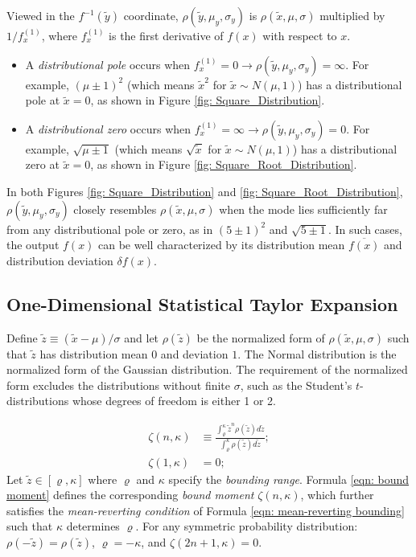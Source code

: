 \documentclass[twoside]{article}
\numberwithin{equation}{section}
\begin{document}
Viewed in the $f^{-1}(\tilde{y})$ coordinate, $\rho(\tilde{y}, \mu_y, \sigma_y)$ is $\rho(\tilde{x}, \mu, \sigma)$ multiplied by $1/f^{(1)}_x$, where $f^{(1)}_x$ is the first derivative of $f(x)$ with respect to $x$.
\begin{itemize}
\item 
A \emph{distributional pole} occurs when $f^{(1)}_x=0 \rightarrow \rho(\tilde{y}, \mu_y, \sigma_y) = \infty$.
For example, $(\mu \pm 1)^2$ (which means $\tilde{x}^2$ for $\tilde{x} \sim N(\mu, 1)$) has a distributional pole at $\tilde{x} = 0$, as shown in Figure \ref{fig: Square_Distribution}.

\item 
A \emph{distributional zero} occurs when $f^{(1)}_x=\infty \rightarrow \rho(\tilde{y}, \mu_y, \sigma_y) = 0$.
For example, $\sqrt{\mu \pm 1}$ (which means $\sqrt{\tilde{x}}$ for $\tilde{x} \sim N(\mu, 1)$) has a distributional zero at $\tilde{x} = 0$, as shown in Figure \ref{fig: Square_Root_Distribution}.

\end{itemize}

In both Figures \ref{fig: Square_Distribution} and \ref{fig: Square_Root_Distribution}, $\rho(\tilde{y}, \mu_y, \sigma_y)$ closely resembles $\rho(\tilde{x}, \mu, \sigma)$ when the mode lies sufficiently far from any distributional pole or zero, as in $(5 \pm 1)^2$ and $\sqrt{5 \pm 1}$.
In such cases, the output $f(x)$ can be well characterized by its distribution mean $\overline{f(x)}$ and distribution deviation $\delta f(x)$. 


\subsection{One-Dimensional Statistical Taylor Expansion}

Define $\tilde{z} \equiv (\tilde{x} - \mu)/\sigma$ and let $\rho(\tilde{z})$ be the normalized form of $\rho(\tilde{x}, \mu, \sigma)$ such that $\tilde{z}$ has distribution mean $0$ and deviation $1$.
The Normal distribution is the normalized form of the Gaussian distribution.
The requirement of the normalized form excludes the distributions without finite $\sigma$, such as the Student's $t$-distributions whose degrees of freedom is either 1 or 2.

\begin{align}
\label{eqn: bound moment}
\zeta(n, \kappa) &\equiv \frac{\int_{\varrho}^{\kappa} \tilde{z}^n \rho(\tilde{z}) d \tilde{z}}{\int_{\varrho}^{\kappa} \rho(\tilde{z}) d \tilde{z}};\\
\label{eqn: mean-reverting bounding}
\zeta(1, \kappa) &= 0;
\end{align}
Let $\tilde{z} \in [\varrho, \kappa]$ where $\varrho$ and $\kappa$ specify the \emph{bounding range}. 
Formula \eqref{eqn: bound moment} defines the corresponding \emph{bound moment} $\zeta(n, \kappa)$, which further satisfies the \emph{mean-reverting condition} of Formula \eqref{eqn: mean-reverting bounding} such that $\kappa$ determines $\varrho$.
For any symmetric probability distribution: $\rho(-\tilde{z}) = \rho(\tilde{z})$, $\varrho = -\kappa$, and $\zeta(2n+1, \kappa) = 0$.
\end{document}
